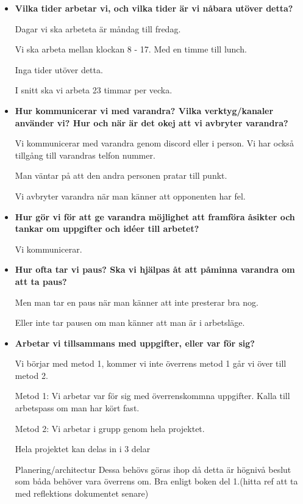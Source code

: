\documentclass{mall}
\begin{document}
\begin{itemize}
\item \textbf{Vilka tider arbetar vi, och vilka tider är vi nåbara utöver detta?}

  Dagar vi ska arbeteta är måndag till fredag.

  Vi ska arbeta mellan klockan 8 - 17. Med en timme till lunch.

  Inga tider utöver detta.

  I snitt ska vi arbeta 23 timmar per vecka.

\item \textbf{Hur kommunicerar vi med varandra? Vilka verktyg/kanaler använder vi? Hur och när är det okej att vi avbryter varandra?}

  Vi kommunicerar med varandra genom discord eller i person. Vi har också tillgång till varandras telfon nummer.
  
  Man väntar på att den andra personen pratar till punkt.

  Vi avbryter varandra när man känner att opponenten har fel. 

\item \textbf{Hur gör vi för att ge varandra möjlighet att framföra åsikter och tankar om uppgifter och idéer till arbetet?}

  Vi kommunicerar.

\item \textbf{Hur ofta tar vi paus? Ska vi hjälpas åt att påminna varandra om att ta paus?}

  Men man tar en paus när man känner att inte presterar bra nog. 

  Eller inte tar pausen om man känner att man är i arbetsläge.

\item \textbf{Arbetar vi tillsammans med uppgifter, eller var för sig?}

  Vi börjar med metod 1, kommer vi inte överrens metod 1 går vi över till metod 2. 

  Metod 1: Vi arbetar var för sig med överrenskommna uppgifter. Kalla till arbetspass om man har kört fast. 

  Metod 2: Vi arbetar i grupp genom hela projektet.

  Hela projektet kan delas in i 3 delar 

  Planering/architectur  Dessa behövs göras ihop då detta är högnivå beslut som båda behöver vara överrens om. Bra enligt boken del 1.(hitta ref att ta med reflektions dokumentet senare)
  

\end{itemize}
\end{document}
